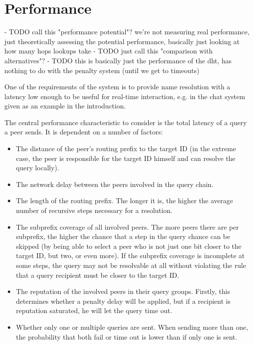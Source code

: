 \chapter{Performance}
\label{chap:performance}
- TODO call this "performance potential"? we're not measuring real performance,
  just theoretically assessing the potential performance, basically just looking
  at how many hops lookups take
- TODO just call this "comparison with alternatives"?
- TODO this is basically just the performance of the dht, has nothing to do with
  the penalty system (until we get to timeouts)

One of the requirements of the system is to provide name resolution with a
latency low enough to be useful for real-time interaction, e.g. in the chat
system given as an example in the introduction.

The central performance characteristic to consider is the total latency of a
query a peer sends. It is dependent on a number of factors:

\begin{itemize}
\item The distance of the peer's routing prefix to the target ID (in the extreme
case, the peer is responsible for the target ID himself and can resolve the
query locally).
\item The network delay between the peers involved in the query chain.
\item The length of the routing prefix. The longer it is, the higher the average
number of recursive steps necessary for a resolution.
\item The subprefix coverage of all involved peers. The more peers there are per
subprefix, the higher the chance that a step in the query chance can be skipped
(by being able to select a peer who is not just one bit closer to the target ID,
but two, or even more). If the subprefix coverage is incomplete at some steps,
the query may not be resolvable at all without violating the rule that a query
recipient must be closer to the target ID.
\item The reputation of the involved peers in their query groups. Firstly, this
determines whether a penalty delay will be applied, but if a recipient is
reputation saturated, he will let the query time out.
\item Whether only one or multiple queries are sent. When sending more than one,
the probability that both fail or time out is lower than if only one is sent.
\end{itemize}

